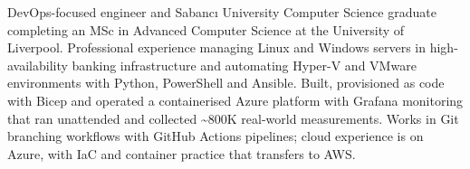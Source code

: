 



DevOps-focused engineer and Sabancı University Computer Science graduate completing an MSc in Advanced Computer Science at the University of Liverpool. Professional experience managing Linux and Windows servers in high-availability banking infrastructure and automating Hyper-V and VMware environments with Python, PowerShell and Ansible. Built, provisioned as code with Bicep and operated a containerised Azure platform with Grafana monitoring that ran unattended and collected \textasciitilde 800K real-world measurements. Works in Git branching workflows with GitHub Actions pipelines; cloud experience is on Azure, with IaC and container practice that transfers to AWS.




